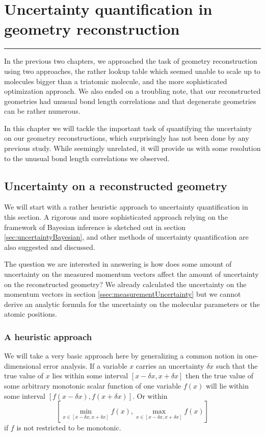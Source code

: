\chapter{Uncertainty quantification in geometry reconstruction} \label{ch:uncertainty}

\vspace{-1.5 em}
\begin{addmargin}[-0.5cm]{0cm}
  \minitoc
\end{addmargin}
\hrule
\vspace{1.5 em}

In the previous two chapters, we approached the task of geometry reconstruction using two approaches, the rather lookup table which seemed unable to scale up to molecules bigger than a triatomic molecule, and the more sophisticated optimization approach. We also ended on a troubling note, that our reconstructed geometries had unusual bond length correlations and that degenerate geometries can be rather numerous.

In this chapter we will tackle the important task of quantifying the uncertainty on our geometry reconstructions, which surprisingly has not been done by any previous study. While seemingly unrelated, it will provide us with some resolution to the unusual bond length correlations we observed.

\section{Uncertainty on a reconstructed geometry}
We will start with a rather heuristic approach to uncertainty quantification in this section. A rigorous and more sophisticated approach relying on the framework of Bayesian inference is sketched out in section \ref{sec:uncertaintyBayesian}, and other methods of uncertainty quantification are also suggested and discussed.

The question we are interested in answering is how does some amount of uncertainty on the measured momentum vectors affect the amount of uncertainty on the reconstructed geometry? We already calculated the uncertainty on the momentum vectors in section \ref{ssec:measurementUncertainty} but we cannot derive an analytic formula for the uncertainty on the molecular parameters or the atomic positions.

\subsection{A heuristic approach}
We will take a very basic approach here by generalizing a common notion in one-dimensional error analysis. If a variable $x$ carries an uncertainty $\delta x$ such that the true value of $x$ lies within some interval $[x - \delta x, x + \delta x]$ then the true value of some arbitrary monotonic scalar function of one variable $f(x)$ will lie within some interval $[f(x - \delta x), f(x + \delta x)]$. Or within
\begin{equation}
\left[ \min_{x \in [x-\delta x, x+\delta x]} f(x), \max_{x \in [x-\delta x, x+\delta x]} f(x) \right]
\end{equation}
if $f$ is not restricted to be monotonic.

